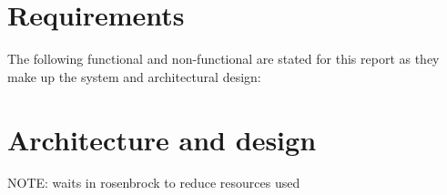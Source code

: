 \section{Requirements}

The following functional and non-functional are stated for this report as they make up the system and architectural design:

\section{Architecture and design}
NOTE: waits in rosenbrock to reduce resources used

